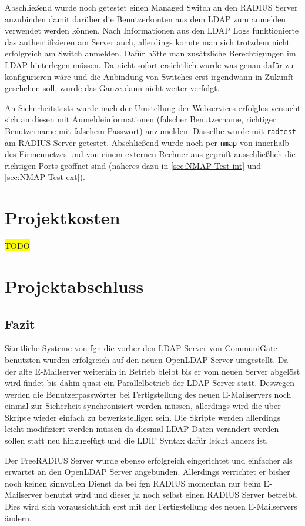 \documentclass[11pt,a4paper,titlepage=firstiscover]{scrartcl} %
\newcommand{\hilight}[1]{\colorbox{yellow}{#1}} %
\begin{document}
Abschließend wurde noch getestet einen Managed Switch an den RADIUS Server anzubinden damit darüber die Benutzerkonten aus dem LDAP zum anmelden verwendet werden können. Nach Informationen aus den LDAP Logs funktionierte das authentifizieren am Server auch, allerdings konnte man sich trotzdem nicht erfolgreich am Switch anmelden. Dafür hätte man zusätzliche Berechtigungen im LDAP hinterlegen müssen. Da nicht sofort ersichtlich wurde was genau dafür zu konfigurieren wäre und die Anbindung von Switches erst irgendwann in Zukunft geschehen soll, wurde das Ganze dann nicht weiter verfolgt.

\medskip \noindent
An Sicherheitstests wurde nach der Umstellung der Webservices erfolglos versucht sich an diesen mit Anmeldeinformationen (falscher Benutzername, richtiger Benutzername mit falschem Passwort) anzumelden. Dasselbe wurde mit \texttt{radtest} am RADIUS Server getestet.
Abschließend wurde noch per \texttt{nmap} von innerhalb des Firmennetzes und von einem externen Rechner aus geprüft ausschließlich die richtigen Ports geöffnet sind (näheres dazu in \autoref{sec:NMAP-Test-int} und \autoref{sec:NMAP-Test-ext}).

\section{Projektkosten}
\hilight{TODO}

\section{Projektabschluss}
\subsection{Fazit}
Sämtliche Systeme von fgn die vorher den LDAP Server von CommuniGate benutzten wurden erfolgreich auf den neuen OpenLDAP Server umgestellt. Da der alte E-Mailserver weiterhin in Betrieb bleibt bis er vom neuen Server abgelöst wird findet bis dahin quasi ein Parallelbetrieb der LDAP Server statt. Deswegen werden die Benutzerpasswörter bei Fertigstellung des neuen E-Mailservers noch einmal zur Sicherheit synchronisiert werden müssen, allerdings wird die über Skripte wieder einfach zu bewerkstelligen sein. Die Skripte werden allerdings leicht modifiziert werden müssen da diesmal LDAP Daten verändert werden sollen statt neu hinzugefügt und die LDIF Syntax dafür leicht anders ist.

Der FreeRADIUS Server wurde ebenso erfolgreich eingerichtet und einfacher als erwartet an den OpenLDAP Server angebunden. Allerdings verrichtet er bisher noch keinen sinnvollen Dienst da bei fgn RADIUS momentan nur beim E-Mailserver benutzt wird und dieser ja noch selbst einen RADIUS Server betreibt. Dies wird sich voraussichtlich erst mit der Fertigstellung des neuen E-Mailservers ändern.
\end{document}
